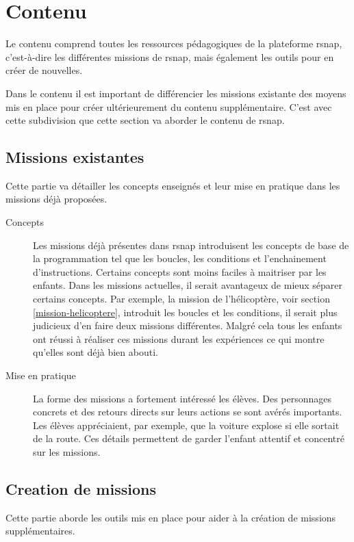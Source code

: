\section{Contenu}
Le contenu comprend toutes les ressources pédagogiques de la plateforme \gls{rsnap}, c'est-à-dire les différentes \glspl{mission} de \gls{rsnap}, mais également les outils pour en créer de nouvelles.

Dans le contenu il est important de différencier les \glspl{mission} existante des moyens mis en place pour créer ultérieurement du contenu supplémentaire. C'est avec cette subdivision que cette section va aborder le contenu de \gls{rsnap}.

\subsection{Missions existantes}
Cette partie va détailler les concepts enseignés et leur mise en pratique dans les \glspl{mission} déjà proposées.
\begin{description}
  \item[Concepts] Les \glspl{mission} déjà présentes dans \gls{rsnap} introduisent les concepts de base de la programmation tel que les boucles, les conditions et l'enchainement d'instructions. Certains concepts sont moins faciles à maitriser par les enfants. Dans les \glspl{mission} actuelles, il serait avantageux de mieux séparer certains concepts. Par exemple, la \gls{mission} de l'hélicoptère, voir section \ref{mission-helicoptere}, introduit les boucles et les conditions, il serait plus judicieux d'en faire deux \glspl{mission} différentes. Malgré cela tous les enfants ont réussi à réaliser ces \glspl{mission} durant les expériences ce qui montre qu'elles sont déjà bien abouti.

  \item[Mise en pratique] La forme des \glspl{mission} a fortement intéressé les élèves. Des personnages concrets et des retours directs sur leurs actions se sont avérés importants. Les élèves appréciaient, par exemple, que la voiture explose si elle sortait de la route. Ces détails permettent de garder l'enfant attentif et concentré sur les \glspl{mission}.
\end{description}

\subsection{Creation de missions}
Cette partie aborde les outils mis en place pour aider à la création de \glspl{mission} supplémentaires.

